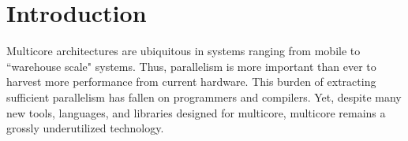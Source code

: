 \section{Introduction}





Multicore architectures are ubiquitous in systems ranging from mobile to
``warehouse scale" systems. Thus, parallelism is more important than ever to
harvest more performance from current hardware.  This burden of extracting
sufficient parallelism has fallen on programmers and compilers. Yet, despite
many new tools, languages, and libraries designed for multicore, multicore
remains a grossly underutilized technology.


